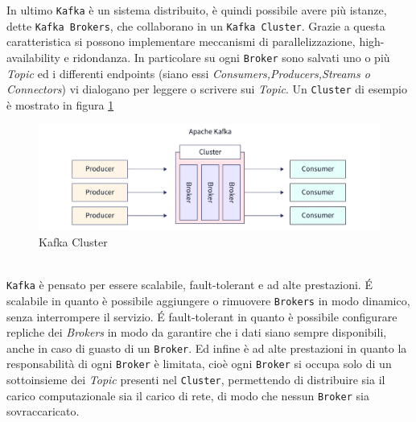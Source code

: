 In ultimo \texttt{Kafka} è un sistema distribuito, è quindi possibile avere più istanze, dette \texttt{Kafka Brokers}, che collaborano in un \texttt{Kafka Cluster}. Grazie a questa caratteristica si possono implementare meccanismi di parallelizzazione, high-availability e ridondanza.
In particolare su ogni \texttt{Broker} sono salvati uno o più \textit{Topic} ed i differenti endpoints (siano essi \textit{Consumers,Producers,Streams o Connectors}) vi dialogano per leggere o scrivere sui \textit{Topic}.
Un \texttt{Cluster} di esempio è mostrato in figura \ref{fig:kafka_cluster}
\begin{figure}[htbp]
    \centering
    \includegraphics[width=\textwidth]{images/kafka/cluster.jpg}
    \caption{Kafka Cluster}
    \label{fig:kafka_cluster}
\end{figure}
\\\texttt{Kafka} è pensato per essere scalabile, fault-tolerant e ad alte prestazioni.
É scalabile in quanto è possibile aggiungere o rimuovere \texttt{Brokers} in modo dinamico, senza interrompere il servizio.
É fault-tolerant in quanto è possibile configurare repliche dei \textit{Brokers} in modo da garantire che i dati siano sempre disponibili, anche in caso di guasto di un \texttt{Broker}.
Ed infine è ad alte prestazioni in quanto la responsabilità di ogni \texttt{Broker} è limitata, cioè ogni \texttt{Broker} si occupa solo di un sottoinsieme dei \textit{Topic} presenti nel \texttt{Cluster}, 
permettendo di distribuire sia il carico computazionale sia il carico di rete, di modo che nessun \texttt{Broker} sia sovraccaricato.

